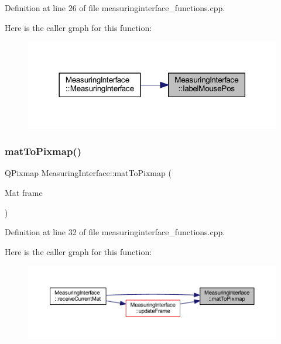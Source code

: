 Definition at line 26 of file measuringinterface\+\_\+functions.\+cpp.

Here is the caller graph for this function\+:
\nopagebreak
\begin{figure}[H]
\begin{center}
\leavevmode
\includegraphics[width=318pt]{class_measuring_interface_a3e7eef22037ecb47ad2349205684c6ea_icgraph}
\end{center}
\end{figure}
\mbox{\label{class_measuring_interface_ae5ad3ff4b380dd0465378dabc4265218}} 
\subsubsection{\texorpdfstring{matToPixmap()}{matToPixmap()}}
{\footnotesize\ttfamily Q\+Pixmap Measuring\+Interface\+::mat\+To\+Pixmap (\begin{DoxyParamCaption}\item[{Mat}]{frame }\end{DoxyParamCaption})\hspace{0.3cm}{\ttfamily [private]}}



Definition at line 32 of file measuringinterface\+\_\+functions.\+cpp.

Here is the caller graph for this function\+:
\nopagebreak
\begin{figure}[H]
\begin{center}
\leavevmode
\includegraphics[width=350pt]{class_measuring_interface_ae5ad3ff4b380dd0465378dabc4265218_icgraph}
\end{center}
\end{figure}
\mbox{\label{class_measuring_interface_a423a52e80d530b4cf1154422b3de5073}} 
